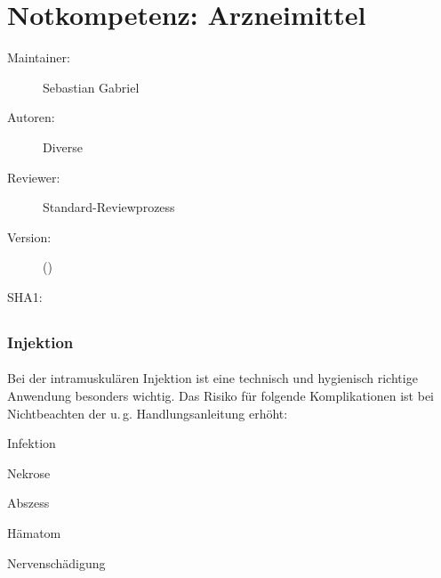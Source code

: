 \def\ChapterCode{NKA}
\chapter
[\CO{[NKA]} Notkompetenz: Arzneimittel]
{Notkompetenz: Arzneimittel}
\label{chp:NKA}




\ChapterIntro
{%

}
{%
\begin{description}
  \item[Maintainer:] Sebastian Gabriel
  \item[Autoren:] Diverse
  \item[Reviewer:] Standard-Reviewprozess
  \item[Version:] {\VarDocVersionTypeName} 
  ({\VarDocVersionTypeDescription})
  \item[SHA1:] {\DocGitCommit}
\end{description}

{\TxTeilkapitelAASS}
}

\section{}

\section{}

\subsection{ Injektion}

\subsubsection{}
Bei der intramuskulären Injektion ist eine
technisch und hygienisch richtige Anwendung besonders wichtig. Das
Risiko für folgende Komplikationen ist bei Nichtbeachten der u.\,g.
Handlungsanleitung erhöht:
 
\begin{compactenum}
\item Infektion
\item Nekrose
\item Abszess
\item Hämatom
\item Nervenschädigung
\end{compactenum}


